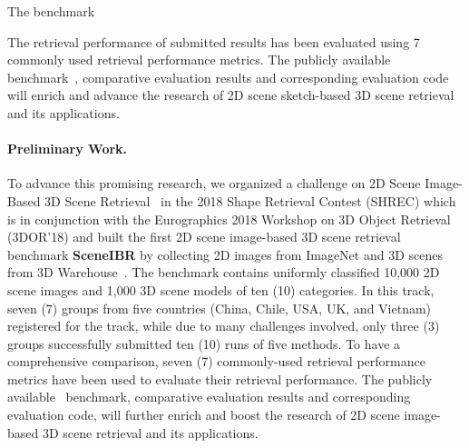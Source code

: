 The benchmark  

The retrieval performance of submitted results has been evaluated using 7 commonly used retrieval performance metrics. The publicly available benchmark~\cite{SHREC18-SceneSBR-Track}, comparative evaluation results and corresponding evaluation code will enrich and advance the research of 2D scene sketch-based 3D scene retrieval and its applications.



\paragraph{Preliminary Work.} 
To advance this promising research, we organized a challenge on 2D Scene Image-Based 3D Scene Retrieval~\cite{DBLP:conf/3dor/AbdulJLL18, SHREC18-SceneIBR-Track} in the 2018 Shape Retrieval Contest (SHREC) which is in conjunction with the Eurographics 2018 Workshop on 3D Object Retrieval (3DOR'18) and built the first 2D scene image-based 3D scene retrieval benchmark \textbf{SceneIBR} by collecting 2D images from ImageNet and 3D scenes from 3D Warehouse~\cite{3DWarehouse}. The benchmark contains uniformly classified 10,000 2D scene images and 1,000 3D scene models of ten (10) categories. In this track, seven (7) groups from five countries (China, Chile, USA, UK, and Vietnam) registered for the track, while due to many challenges involved, only three (3) groups successfully submitted ten (10) runs of five methods. To have a comprehensive comparison, seven (7) commonly-used retrieval performance metrics have been used to evaluate their retrieval performance. The publicly available~\cite{SHREC18-SceneIBR-Track} benchmark, comparative evaluation results and corresponding evaluation code, will further enrich and boost the research of 2D scene image-based 3D scene retrieval and its applications.


